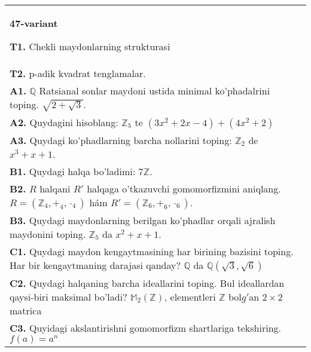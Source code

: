 \documentclass{article}
\begin{document}
\begin{tabular}{m{17cm}}
\textbf{47-variant}
\newline

\textbf{T1.} Chekli maydonlarning strukturasi \\
\textbf{T2.} p-adik kvadrat tenglamalar. \\
\textbf{A1.} \(\mathbb{Q}\) Ratsianal sonlar maydoni ustida minimal ko'phadalrini toping.
\(\sqrt{2 + \sqrt{3}}\). \\
\textbf{A2.} Quydagini hisoblang:
\(\mathbb{Z}_{5}\) te \(\left( 3x^{2} + 2x - 4 \right) + \left( 4x^{2} + 2 \right)\) \\
\textbf{A3.} Quydagi ko'phadlarning barcha nollarini toping:
\(\mathbb{Z}_{2}\) de \(x^{3} + x + 1\). \\
\textbf{B1.} Quydagi halqa bo'ladimi:
\(7\mathbb{Z}\). \\
\textbf{B2.} \(R\) halqani \(R'\) halqaga o'tkazuvchi gomomorfizmini aniqlang.
\(R = (\mathbb{Z}_{4}, +_{4}, \cdot_{4})\) hám \(R' = (\mathbb{Z}_{6}, +_{6}, \cdot_{6})\). \\
\textbf{B3.} Quydagi maydonlarning berilgan ko'phadlar orqali ajralish maydonini toping.
\(\mathbb{Z}_{5}\) da \(x^{2} + x + 1\). \\
\textbf{C1.} Quydagi maydon kengaytmasining har birining bazisini toping. Har bir kengaytmaning darajasi qanday?
\(\mathbb{Q}\) da \(\mathbb{Q}\left( \sqrt{3},\sqrt{6} \right)\) \\
\textbf{C2.} Quydagi halqaning barcha ideallarini toping. Bul ideallardan qaysi-biri maksimal bo'ladi?
\(\mathbb{M}_{2}\left( \mathbb{Z} \right)\), elementleri \(\mathbb{Z}\) bol\(g'\)an \(2 \times 2\) matrica \\
\textbf{C3.} Quyidagi akslantirishni gomomorfizm shartlariga tekshiring. \(f(a) = a^{n}\) \\

\end{tabular}
\vspace{1cm}
\end{document}
